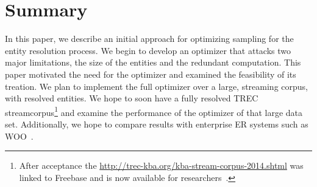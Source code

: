 

\section{Summary}

In this paper, we describe an initial approach for optimizing sampling for the entity resolution process.
We begin to develop an optimizer that attacks two major limitations, the size of the entities and the redundant computation.
This paper motivated the need for the optimizer and examined the feasibility of its treation.
We plan to implement the full optimizer over a large, streaming corpus, with resolved entities.
We hope to soon have a fully resolved TREC streamcorpus\footnote{After acceptance the \url{http://trec-kba.org/kba-stream-corpus-2014.shtml} was linked to Freebase and is now available for researchers~\cite{dalton2015fakba1}.} and examine the performance of the optimizer of that large data set.
Additionally, we hope to compare results with enterprise ER systems such as WOO~\cite{bellare2013woo}.
